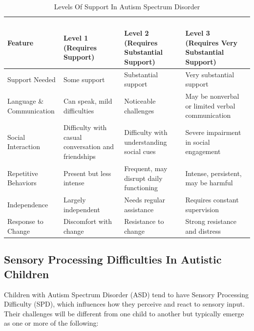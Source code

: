 \documentclass[a4paper,12pt]{report}
\begin{document}
\renewcommand{\arraystretch}{1.8}  %
\begin{table}[h]
\centering
\caption{Levels Of Support In Autism Spectrum Disorder}
\vspace{0.5em}

\begin{tabular}{|>{\centering\arraybackslash}m{3.5cm}
                |>{\centering\arraybackslash}m{3.8cm}
                |>{\centering\arraybackslash}m{4cm}
                |>{\centering\arraybackslash}m{4.2cm}|}
\hline
\textbf{Feature} &
\makecell {\\ \textbf{Level 1} \\ \small(Requires Support) } &
\makecell{\\ \textbf{Level 2} \\ \small(Requires Substantial \\ Support)} &
\makecell{\\ \textbf{Level 3} \\ \small(Requires Very \\Substantial Support)} \\
\hline

Support Needed & Some support & Substantial support & Very substantial support \\
\hline
\makecell{Language \& \\ Communication} & Can speak, mild difficulties & Noticeable challenges & May be nonverbal or limited verbal communication \\
\hline
Social Interaction & Difficulty with casual conversation and friendships & Difficulty with understanding social cues & Severe impairment in social engagement \\
\hline
\makecell{Repetitive \\ Behaviors } & Present but less intense & Frequent, may disrupt daily functioning & Intense, persistent, may be harmful \\
\hline
Independence & Largely independent & Needs regular assistance & Requires constant supervision \\
\hline
Response to Change & Discomfort with change & Resistance to change & Strong resistance and distress \\
\hline
\end{tabular}
\label{tab:asd_support_levels}
\end{table}

\newpage
\subsection{Sensory Processing Difficulties In Autistic Children}
Children with Autism Spectrum Disorder (ASD) tend to have Sensory Processing Difficulty (SPD), which influences how they perceive and react to sensory input. Their challenges will be different from one child to another but typically emerge as one or more of the following:
\end{document}
